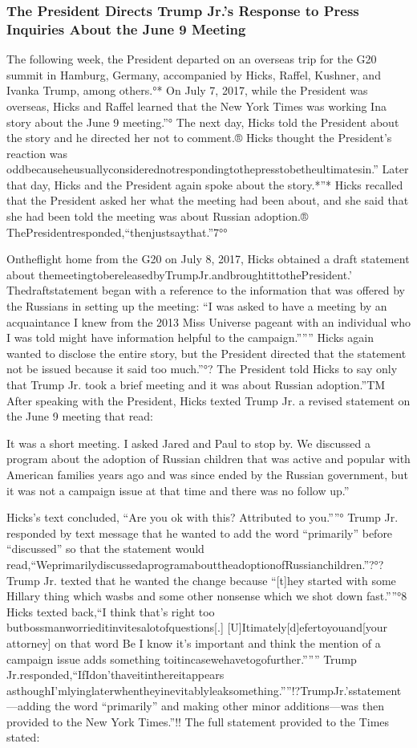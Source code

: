\subsubsection{The President Directs Trump Jr.'s Response to Press Inquiries About the June 9 Meeting}

The following week, the President departed on an overseas trip for the G20 summit in Hamburg, Germany, accompanied by Hicks, Raffel, Kushner, and Ivanka Trump, among others.°* On July 7, 2017, while the President was overseas, Hicks and Raffel learned that the New York Times was working Ina story about the June 9 meeting.”° The next day, Hicks told the President about the story and he directed her not to comment.® Hicks thought the President's reaction was oddbecauseheusuallyconsiderednotrespondingtothepresstobetheultimatesin.” Later that day, Hicks and the President again spoke about the story.*”* Hicks recalled that the President asked her what the meeting had been about, and she said that she had been told the meeting was about Russian adoption.® ThePresidentresponded,“thenjustsaythat.”7°°

Ontheflight home from the G20 on July 8, 2017, Hicks obtained a draft statement about themeetingtobereleasedbyTrumpJr.andbroughtittothePresident.' Thedraftstatement began with a reference to the information that was offered by the Russians in setting up the meeting: “I was asked to have a meeting by an acquaintance I knew from the 2013 Miss Universe pageant with an individual who I was told might have information helpful to the campaign.””” Hicks again wanted to disclose the entire story, but the President directed that the statement not be
issued because it said too much.”°? The President told Hicks to say only that Trump Jr. took a brief meeting and it was about Russian adoption.”TM After speaking with the President, Hicks texted Trump Jr. a revised statement on the June 9 meeting that read:

It was a short meeting. I asked Jared and Paul to stop by. We discussed a program about the adoption of Russian children that was active and popular with American families years ago and was since ended by the Russian government, but it was not a campaign issue at that time and there was no follow up.”

Hicks's text concluded, “Are you ok with this? Attributed to you.””° Trump Jr. responded by text message that he wanted to add the word “primarily” before “discussed” so that the statement would read,“WeprimarilydiscussedaprogramabouttheadoptionofRussianchildren.”?°? Trump Jr. texted that he wanted the change because “[t]hey started with some Hillary thing which wasbs and some other nonsense which we shot down fast.””°8 Hicks texted back,“I think that's right too butbossmanworrieditinvitesalotofquestions[.] [U]Itimately[d]efertoyouand[your attorney] on that word Be I know it's important and think the mention of a campaign issue adds something toitincasewehavetogofurther.””” Trump Jr.responded,“IfIdon'thaveitinthereitappears asthoughI'mlyinglaterwhentheyinevitablyleaksomething.””!?TrumpJr.'sstatement—adding the word “primarily” and making other minor additions—was then provided to the New York Times.”!! The full statement provided to the Times stated:

